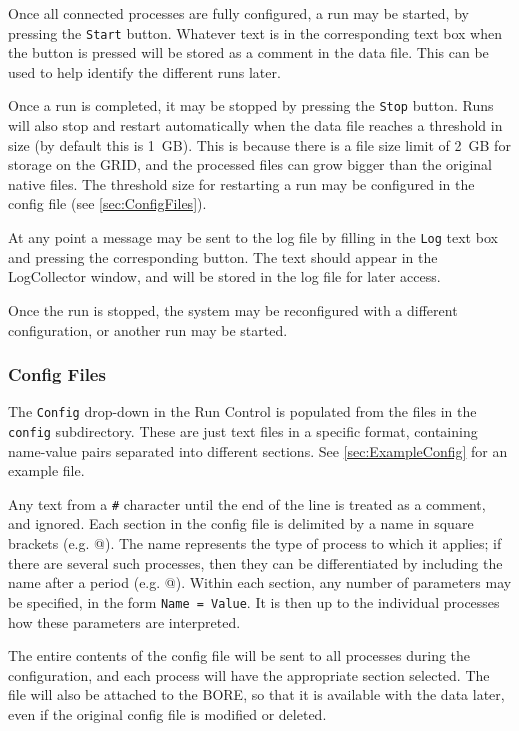 Once all connected processes are fully configured, a run may be started, by pressing the \texttt{Start} button.
Whatever text is in the corresponding text box when the button is pressed
will be stored as a comment in the data file.
This can be used to help identify the different runs later.

Once a run is completed, it may be stopped by pressing the \texttt{Stop} button.
Runs will also stop and restart automatically when the data file reaches a threshold in size
(by default this is 1~GB).
This is because there is a file size limit of 2~GB for storage on the GRID,
and the processed files can grow bigger than the original native files.
The threshold size for restarting a run may be configured in the config file (see \autoref{sec:ConfigFiles}).

At any point a message may be sent to the log file by filling in the \texttt{Log} text box and pressing the corresponding button.
The text should appear in the LogCollector window, and will be stored in the log file for later access.

Once the run is stopped, the system may be reconfigured with a different configuration, or another run may be started.

\subsubsection{Config Files}\label{sec:ConfigFiles}
The \texttt{Config} drop-down in the Run Control is populated from the files in the \texttt{config} subdirectory.
These are just text files in a specific format, containing name-value pairs separated into different sections.
See \autoref{sec:ExampleConfig} for an example file.

Any text from a \texttt{\#} character until the end of the line is treated as a comment, and
ignored.  Each section in the config file is delimited by a name in square brackets
(e.g. \verb@[RunControl]@).  The name represents the type of process to which it applies; if there
are several such processes, then they can be differentiated by including the name after a period
(e.g. @).  Within each section, any number of parameters may be specified,
in the form \mbox{\texttt{Name = Value}}.  It is then up to the individual processes how these
parameters are interpreted.

The entire contents of the config file will be sent to all processes during the configuration, and
each process will have the appropriate section selected.  The file will also be attached to the
\gls{BORE}, so that it is available with the data later, even if the original config file is
modified or deleted.

